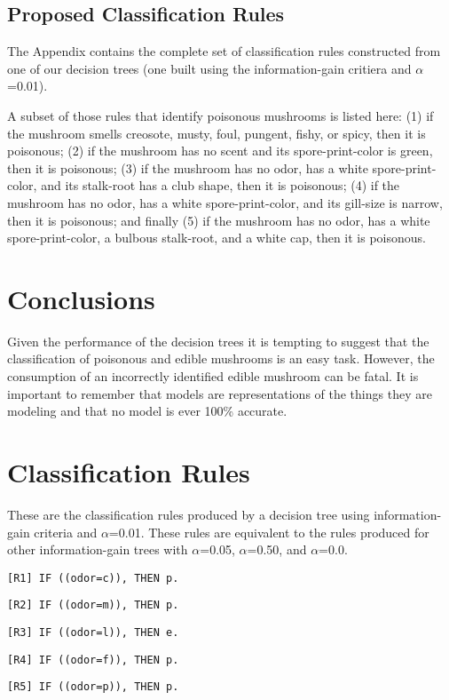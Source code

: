 \documentclass{IEEEtran}
\begin{document}
\subsection{Proposed Classification Rules}
The Appendix contains the complete set of classification rules
constructed from one of our decision trees (one built using the
information-gain critiera and $\alpha$=0.01). 

A subset of those rules that identify poisonous mushrooms is listed
here: (1) if the mushroom smells creosote, musty, foul, pungent,
fishy, or spicy, then it is poisonous; (2) if the mushroom has no
scent and its spore-print-color is green, then it is poisonous; (3) if
the mushroom has no odor, has a white spore-print-color, and its
stalk-root has a club shape, then it is poisonous; (4) if the mushroom
has no odor, has a white spore-print-color, and its gill-size is
narrow, then it is poisonous; and finally (5) if the mushroom has no
odor, has a white spore-print-color, a bulbous stalk-root, and a white
cap, then it is poisonous. 


\section{Conclusions}
Given the performance of the decision trees it is tempting to suggest
that the classification of poisonous and edible mushrooms is an easy
task. However, the consumption of an incorrectly identified edible
mushroom can be fatal. It is important to remember that models are
representations of the things they are modeling and that no model is
ever 100\% accurate. 

\printbibliography

\newpage
\onecolumn
\appendix
\section{ Classification Rules}
These are the classification rules produced by a decision tree using
information-gain criteria and $\alpha$=0.01. These rules are equivalent to
the rules produced for other information-gain trees with $\alpha$=0.05,
$\alpha$=0.50, and $\alpha$=0.0.

\texttt{[R1] IF ((odor=c)), THEN p.}

\texttt{[R2] IF ((odor=m)), THEN p.}

\texttt{[R3] IF ((odor=l)), THEN e.}

\texttt{[R4] IF ((odor=f)), THEN p.}

\texttt{[R5] IF ((odor=p)), THEN p.}
\end{document}
